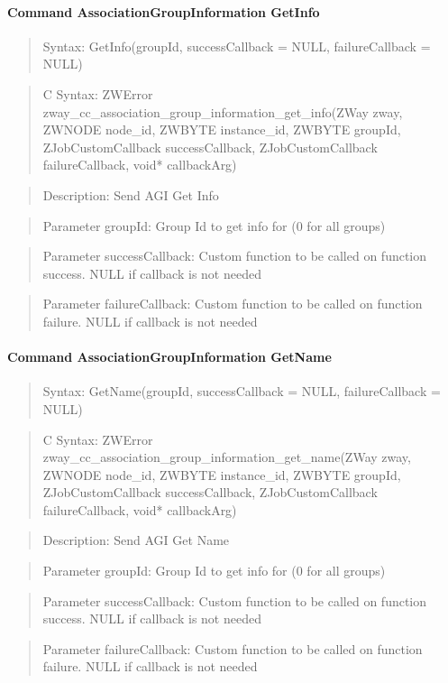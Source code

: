 \paragraph{Command AssociationGroupInformation GetInfo}
\begin{quote}Syntax: GetInfo(groupId, successCallback = NULL, failureCallback = NULL)\end{quote}
\begin{quote}C Syntax: ZWError zway\_cc\_association\_group\_information\_get\_info(ZWay zway, ZWNODE node\_id, ZWBYTE instance\_id, ZWBYTE groupId, ZJobCustomCallback successCallback, ZJobCustomCallback failureCallback, void* callbackArg)\end{quote}
\begin{quote}Description: Send AGI Get Info\end{quote}
\begin{quote}Parameter groupId: Group Id to get info for (0 for all groups)\end{quote}
\begin{quote}Parameter successCallback: Custom function to be called on function success. NULL if callback is not needed\end{quote}
\begin{quote}Parameter failureCallback: Custom function to be called on function failure. NULL if callback is not needed\end{quote}


\paragraph{Command AssociationGroupInformation GetName}
\begin{quote}Syntax: GetName(groupId, successCallback = NULL, failureCallback = NULL)\end{quote}
\begin{quote}C Syntax: ZWError zway\_cc\_association\_group\_information\_get\_name(ZWay zway, ZWNODE node\_id, ZWBYTE instance\_id, ZWBYTE groupId, ZJobCustomCallback successCallback, ZJobCustomCallback failureCallback, void* callbackArg)\end{quote}
\begin{quote}Description: Send AGI Get Name\end{quote}
\begin{quote}Parameter groupId: Group Id to get info for (0 for all groups)\end{quote}
\begin{quote}Parameter successCallback: Custom function to be called on function success. NULL if callback is not needed\end{quote}
\begin{quote}Parameter failureCallback: Custom function to be called on function failure. NULL if callback is not needed\end{quote}


